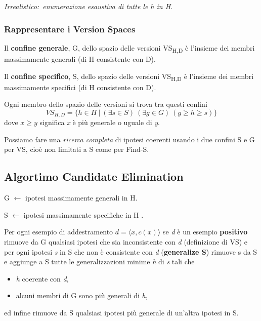 \noindent \textit{Irrealistico:\ enumerazione esaustiva di tutte le h in H.}

\subsubsection{Rappresentare i Version Spaces}

Il \textbf{confine generale}, G, dello spazio delle versioni VS\textsubscript{H,D} è l'insieme dei membri massimamente generali (di H consistente con D).\

\noindent Il \textbf{confine specifico}, S, dello spazio delle versioni VS\textsubscript{H,D} è l'insieme dei membri massimamente specifici (di H consistente con D).\

\begin{theorem}
	Ogni membro dello spazio delle versioni si trova tra questi confini
	\[
		\mathit{VS}_{H,D} = \{h \in H\ |\ (\exists s\in S)\ (\exists g \in G)\ (g \geq h \geq s)\}
	\]
	dove $x \geq y$ significa \textit{x} è più generale o uguale di \textit{y}.\
\end{theorem}

\noindent Possiamo fare una \textit{ricerca completa} di ipotesi coerenti usando i due confini S e G per VS, cioè non limitati a S come per Find-S.\

\subsection{Algortimo Candidate Elimination}

\begin{flushleft}
	G $\leftarrow$ ipotesi massimamente generali in H.

	S $\leftarrow$ ipotesi massimamente specifiche in H .
\end{flushleft}

\noindent Per ogni esempio di addestramento $ d = \langle x, c(x) \rangle $ se \textit{d} è un esempio \textbf{positivo} rimuove da G qualsiasi ipotesi che sia inconsistente con \textit{d} (definizione di VS) e per ogni ipotesi \textit{s} in S che non è consistente con \textit{d} (\textbf{generalize S}) rimuove s da S e aggiunge a S tutte le generalizzazioni minime \textit{h} di \textit{s} tali che
\begin{itemize}
	\item \textit{h} coerente con \textit{d},
	\item alcuni membri di G sono più generali di \textit{h},
\end{itemize}
ed infine rimuove da S qualsiasi ipotesi più generale di un'altra ipotesi in S.\

